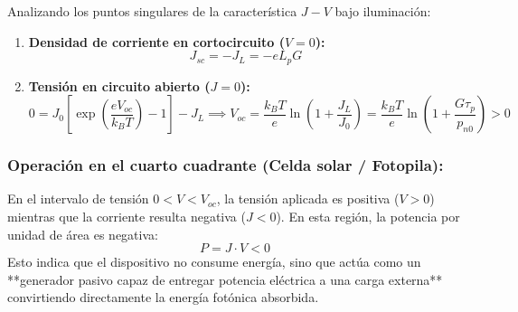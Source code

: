 \begin{problema}
Analizando los puntos singulares de la característica $J-V$ bajo iluminación:
\begin{enumerate}
    \item \textbf{Densidad de corriente en cortocircuito ($V = 0$):}
    \[
    J_{sc} = -J_L = -e L_p G
    \]
    \item \textbf{Tensión en circuito abierto ($J = 0$):}
    \[
    0 = J_0 \left[ \exp\left(\frac{e V_{oc}}{k_B T}\right) - 1 \right] - J_L \implies V_{oc} = \frac{k_B T}{e} \ln\left(1 + \frac{J_L}{J_0}\right) = \frac{k_B T}{e} \ln\left(1 + \frac{G \tau_p}{p_{n0}}\right) > 0
    \]
\end{enumerate}

\subsubsection*{Operación en el cuarto cuadrante (Celda solar / Fotopila):}
En el intervalo de tensión $0 < V < V_{oc}$, la tensión aplicada es positiva ($V > 0$) mientras que la corriente resulta negativa ($J < 0$). En esta región, la potencia por unidad de área es negativa:
\[
P = J \cdot V < 0
\]
Esto indica que el dispositivo no consume energía, sino que actúa como un **generador pasivo capaz de entregar potencia eléctrica a una carga externa** convirtiendo directamente la energía fotónica absorbida.
\end{problema}

